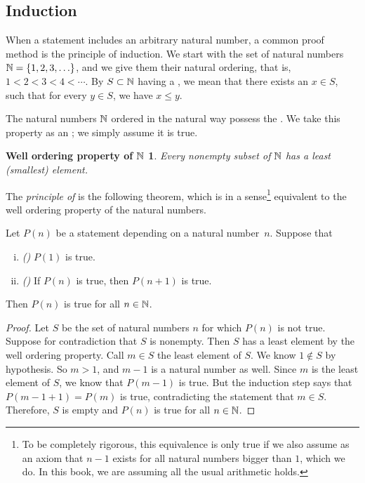 \subsection{Induction}

When a statement includes an arbitrary natural number,
a common proof method is the principle of induction.  
We start with the set of natural numbers ${\mathbb{N}} = \{ 1,2,3,\ldots \}$, and we
give them their natural ordering, 
that is, $1 < 2 < 3 < 4 < \cdots$.
By $S \subset {\mathbb{N}}$ having a \emph{}, we mean that
there exists an $x \in S$,
such that for every
$y \in S$, we have $x \leq y$.

The natural numbers ${\mathbb{N}}$ ordered in the natural way
possess the \emph{}.
We take this property
as an ; we simply assume it is true.

\theoremstyle{plain}
\newtheorem*{wellordprop}{Well ordering property of ${\mathbb{N}}$}
\hypertarget{wop:link}{}%
\begin{wellordprop}
Every nonempty subset of ${\mathbb{N}}$ has a least (smallest) element.
\end{wellordprop}

The \emph{principle of } is
the following theorem, which is in a sense\footnote{To be completely
rigorous, this equivalence is only true if we
also assume as an axiom that $n-1$ exists for all natural numbers bigger than $1$, which we
do.  In this book, we are assuming all the usual arithmetic holds.}
equivalent to the well ordering property of the natural numbers.

\begin{thm} \label{induction:thm}
Let $P(n)$ be a statement depending on a natural number~$n$.  Suppose that
\begin{enumerate}[(i)]
\item \emph{()} $P(1)$ is true.
\item \emph{()} If $P(n)$ is true, then $P(n+1)$ is true.
\end{enumerate}
Then $P(n)$ is true for all $n \in {\mathbb{N}}$.
\end{thm}

\begin{proof}
Let $S$ be the set of natural numbers $n$ for which $P(n)$ is
not true.  Suppose for contradiction that
$S$ is nonempty.  Then $S$ has a least element by the well ordering
property.  Call $m \in S$ the least element of $S$.  We know $1 \notin
S$ by hypothesis.  So $m > 1$, and $m-1$ is a natural number as well.
Since $m$ is the least element of $S$, we know that $P(m-1)$ is true.
But the induction step says that $P(m-1+1) = P(m)$ is true, 
contradicting the statement that $m \in S$.  Therefore, $S$ is empty and 
$P(n)$ is true for all $n \in {\mathbb{N}}$.
\end{proof}


